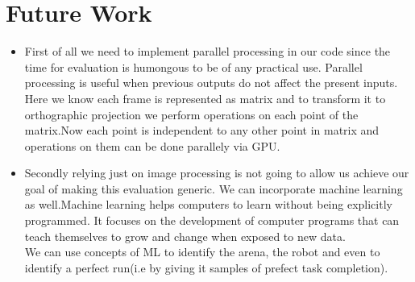 \documentclass[a4paper,12pt,oneside]{book}
\begin{document}
\section{Future Work}
\begin{itemize}
\item First of all we need to implement parallel processing in our code since the time for evaluation is humongous to be of any practical use.
Parallel processing is useful when previous outputs do not affect the present inputs.\\
Here we know each frame is represented as matrix and to transform it to orthographic projection we perform operations on each point of the matrix.Now each point is independent to any other point in matrix and operations on them can be done parallely via GPU.
\item Secondly relying just on image processing is not going to allow us achieve our goal of making this evaluation generic. We can incorporate machine learning as well.Machine learning helps computers to learn without being explicitly programmed. It focuses on the development of computer programs that can teach themselves to grow and change when exposed to new data.\\
We can use concepts of ML to identify the arena, the robot and even to identify a perfect run(i.e by giving it samples of prefect task completion).
\end{itemize}
\end{document}
